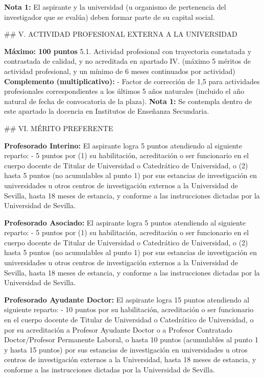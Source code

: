 \documentclass{article}
\begin{document}
\begin{itemize}
\begin{itemize}
\begin{scriptsize}
                  \textbf{Nota 1:} El aspirante y la universidad (u organismo de pertenencia del investigador que se evalúa) deben formar parte de su capital social.

                  \#\# V. ACTIVIDAD PROFESIONAL EXTERNA A LA UNIVERSIDAD

                  \textbf{Máximo: 100 puntos}
                  5.1. Actividad profesional con trayectoria constatada y contrastada de calidad, y no acreditada en apartado IV.
                  (máximo 5 méritos de actividad profesional, y un mínimo de 6 meses continuados por actividad)
                  \textbf{Complemento (multiplicativo):}
                  - Factor de corrección de 1,5 para actividades profesionales correspondientes a los últimos 5 años naturales (incluido el año natural de fecha de convocatoria de la plaza).
                  \textbf{Nota 1:} Se contempla dentro de este apartado la docencia en Institutos de Enseñanza Secundaria.

                  \#\# VI. MÉRITO PREFERENTE

                  \textbf{Profesorado Interino:}
                  El aspirante logra 5 puntos atendiendo al siguiente reparto:
                  - 5 puntos por (1) su habilitación, acreditación o ser funcionario en el cuerpo docente de Titular de Universidad o Catedrático de Universidad, o (2) hasta 5 puntos (no acumulables al punto 1) por sus estancias de investigación en universidades u otros centros de investigación externos a la Universidad de Sevilla, hasta 18 meses de estancia, y conforme a las instrucciones dictadas por la Universidad de Sevilla.

                  \textbf{Profesorado Asociado:}
                  El aspirante logra 5 puntos atendiendo al siguiente reparto:
                  - 5 puntos por (1) su habilitación, acreditación o ser funcionario en el cuerpo docente de Titular de Universidad o Catedrático de Universidad, o (2) hasta 5 puntos (no acumulables al punto 1) por sus estancias de investigación en universidades u otros centros de investigación externos a la Universidad de Sevilla, hasta 18 meses de estancia, y conforme a las instrucciones dictadas por la Universidad de Sevilla.

                  \textbf{Profesorado Ayudante Doctor:}
                  El aspirante logra 15 puntos atendiendo al siguiente reparto:
                  - 10 puntos por su habilitación, acreditación o ser funcionario en el cuerpo docente de Titular de Universidad o Catedrático de Universidad, o por su acreditación a Profesor Ayudante Doctor o a Profesor Contratado Doctor/Profesor Permanente Laboral, o hasta 10 puntos (acumulables al punto 1 y hasta 15 puntos) por sus estancias de investigación en universidades u otros centros de investigación externos a la Universidad, hasta 18 meses de estancia, y conforme a las instrucciones dictadas por la Universidad de Sevilla.


\end{scriptsize}
\end{itemize}
\end{itemize}
\end{document}
